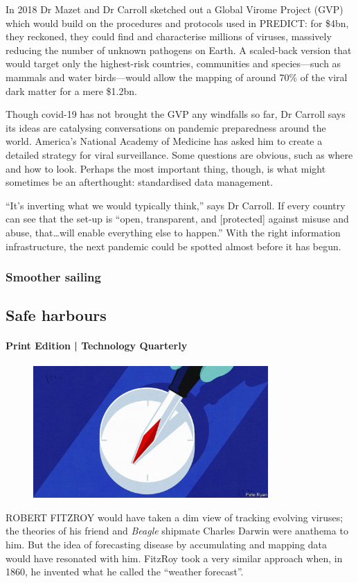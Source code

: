 \documentclass{article}
\begin{document}
In 2018 Dr Mazet and Dr Carroll sketched out a Global Virome Project (GVP) which would build on the procedures and protocols used in PREDICT: for \$4bn, they reckoned, they could find and characterise millions of viruses, massively reducing the number of unknown pathogens on Earth. A scaled-back version that would target only the highest-risk countries, communities and species---such as mammals and water birds---would allow the mapping of around 70\% of the viral dark matter for a mere \$1.2bn. 

Though covid-19 has not brought the GVP any windfalls so far, Dr Carroll says its ideas are catalysing conversations on pandemic preparedness around the world. America's National Academy of Medicine has asked him to create a detailed strategy for viral surveillance. Some questions are obvious, such as where and how to look. Perhaps the most important thing, though, is what might sometimes be an afterthought: standardised data management. 

``It's inverting what we would typically think,'' says Dr Carroll. If every country can see that the set-up is ``open, transparent, and {[}protected{]} against misuse and abuse, that\ldots{}will enable everything else to happen.'' With the right information infrastructure, the next pandemic could be spotted almost before it has begun. {} 
\clearpage
\subsubsection{Smoother sailing }
\subsection{Safe harbours }
\paragraph{Print Edition | Technology Quarterly  \quad \color{gray}{Mar 23rd 2021 }}
\begin{figure}[h]
\centering
\includegraphics[width=0.8\textwidth]{images/20210327_tqd007.jpg}
\end{figure}
\lettrine{R}OBERT FITZROY would have taken a dim view of tracking evolving viruses; the theories of his friend and \emph{Beagle} shipmate Charles Darwin were anathema to him. But the idea of forecasting disease by accumulating and mapping data would have resonated with him. FitzRoy took a very similar approach when, in 1860, he invented what he called the ``weather forecast''. 
\end{document}

